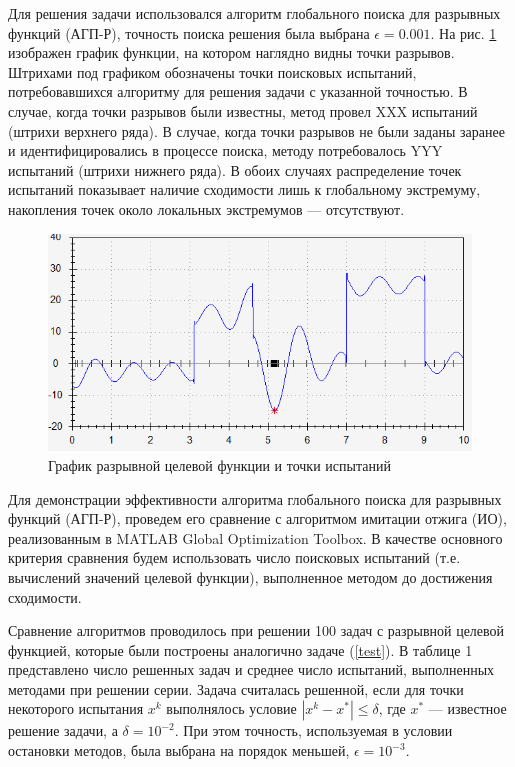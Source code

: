 \documentclass[11pt, oneside, a4paper]{article}
\begin{document}
Для решения задачи использовался алгоритм глобального поиска для разрывных функций (АГП-Р), точность поиска решения была выбрана $\epsilon = 0.001$. На рис. \ref{ris1} изображен график функции, на котором наглядно видны точки разрывов. 
Штрихами под графиком обозначены точки поисковых испытаний, потребовавшихся алгоритму для решения задачи с указанной точностью. 
В случае, когда точки разрывов были известны, метод провел XXX испытаний (штрихи верхнего ряда). В случае, когда точки разрывов не были заданы заранее и идентифицировались в процессе поиска, методу потребовалось YYY испытаний (штрихи нижнего ряда). В обоих случаях распределение точек испытаний показывает наличие сходимости лишь к глобальному экстремуму, накопления точек около локальных экстремумов --- отсутствуют.

\begin{figure}%
	\begin{center}
			\includegraphics[width=0.7\linewidth]{ris1.png}
			\caption{График разрывной целевой функции и точки испытаний} %
      \label{ris1}
	\end{center}
\end{figure}


Для демонстрации эффективности алгоритма глобального поиска для разрывных функций (АГП-Р), проведем его сравнение с алгоритмом имитации отжига (ИО), реализованным в MATLAB Global Optimization Toolbox. В качестве основного критерия сравнения будем использовать число поисковых испытаний (т.е. вычислений значений целевой функции), выполненное методом до достижения сходимости. 

Сравнение алгоритмов проводилось при решении 100 задач с разрывной целевой функцией, которые были построены аналогично задаче (\ref{test}). В таблице 1 представлено число решенных задач и среднее число испытаний, выполненных методами при решении серии. Задача считалась решенной, если для точки некоторого испытания $x^k$ выполнялось условие $\left|x^k-x^*\right|\leq \delta$, где $x^*$ --- известное решение задачи, а $\delta = 10^{-2}$. При этом точность, используемая в условии остановки методов, была выбрана на порядок меньшей, $\epsilon=10^{-3}$.
\end{document}
